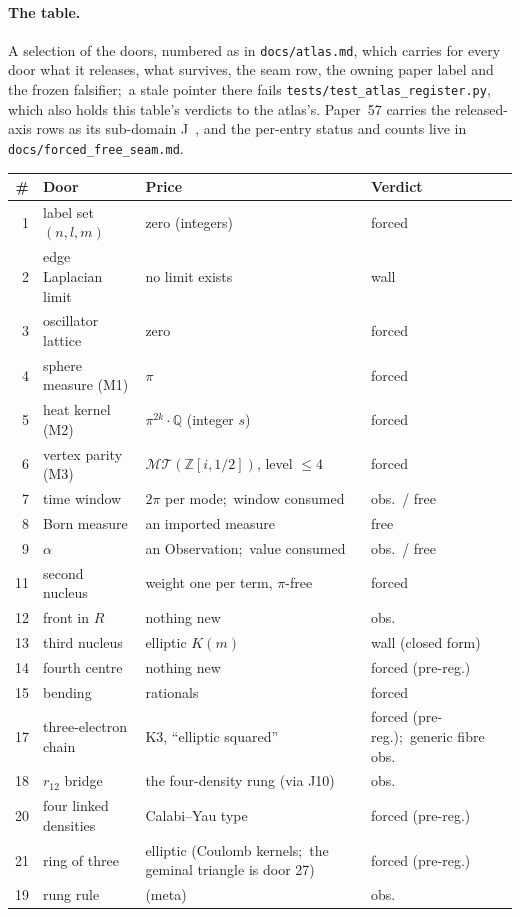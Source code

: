\documentclass[11pt,a4paper]{article}
\newcommand{\Z}{\mathbb{Z}}
\newcommand{\Q}{\mathbb{Q}}
\newcommand{\MT}{\mathcal{MT}}
\begin{document}
\paragraph{The table.}
A selection of the doors, numbered as in \texttt{docs/atlas.md}, which
carries for every door what it releases, what survives, the seam row,
the owning paper label and the frozen falsifier;\ a stale pointer there
fails \texttt{tests/test\_atlas\_register.py}, which also holds this
table's verdicts to the atlas's.  Paper~57 carries the released-axis
rows as its sub-domain J~\cite{loutey_paper57}, and the per-entry
status and counts live in \texttt{docs/forced\_free\_seam.md}.

\begin{center}
\small
\begin{tabular}{@{}rp{3.4cm}p{5.6cm}p{3.3cm}@{}}
\toprule
\# & Door & Price & Verdict \\
\midrule
1 & label set $(n,l,m)$ & zero (integers) & forced \\
2 & edge Laplacian limit & no limit exists & wall \\
3 & oscillator lattice & zero & forced \\
4 & sphere measure (M1) & $\pi$ & forced \\
5 & heat kernel (M2) & $\pi^{2k}\cdot\Q$ (integer $s$) & forced \\
6 & vertex parity (M3) & $\MT(\Z[i,1/2])$, level $\le 4$ & forced \\
7 & time window & $2\pi$ per mode;\ window consumed & obs.\ / free \\
8 & Born measure & an imported measure & free \\
9 & $\alpha$ & an Observation;\ value consumed & obs.\ / free \\
11 & second nucleus & weight one per term, $\pi$-free & forced \\
12 & front in $R$ & nothing new & obs. \\
13 & third nucleus & elliptic $K(m)$ & wall (closed form) \\
14 & fourth centre & nothing new & forced (pre-reg.) \\
15 & bending & rationals & forced \\
17 & three-electron chain & K3, ``elliptic squared'' & forced (pre-reg.);\ generic fibre obs. \\
18 & $r_{12}$ bridge & the four-density rung (via J10) & obs. \\
20 & four linked densities & Calabi--Yau type & forced (pre-reg.) \\
21 & ring of three & elliptic (Coulomb kernels;\ the geminal triangle is door 27) & forced (pre-reg.) \\
19 & rung rule & (meta) & obs. \\
\bottomrule
\end{tabular}
\end{center}
\end{document}
